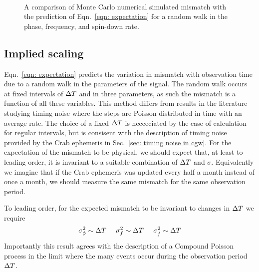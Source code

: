 \begin{figure}[ht]
\centering
{}
\\ 
\caption{A comparison of Monte Carlo numerical simulated mismatch with the prediction
of Eqn.~\eqref{eqn: expectation} for a random walk in the phase, frequency,
and spin-down rate.}
\label{fig: rw I}
\end{figure}

\subsection{Implied scaling}

Eqn.~\eqref{eqn: expectation} predicts the variation in mismatch with
observation time due to a random walk in the parameters of the signal. The
random walk occurs at fixed intervals of $\Delta T$ and in three parameters, as such
the mismatch is a function of all these variables. This method differs from
results in the literature studying timing noise \citep{Cordes1981} where the
steps are Poisson distributed in time with an average rate. The choice of a
fixed $\Delta T$ is necceciated by the ease of calculation for regular intervals,
but is consisent with the description of timing noise provided by the Crab
ephemeris in Sec.~\ref{sec: timing noise in cgw}.  For the expectation of the
mismatch to be physical, we should expect that, at least to leading order, it
is invariant to a suitable combination of $\Delta T$ and $\sigma$. Equivalently we
imagine that if the Crab ephemeris was updated every half a month instead of
once a month, we should measure the same mismatch for the same observation
period.

To leading order, for the expected mismatch to be invariant to changes in $\Delta T$
we require
\begin{equation}
\sigma_{\phi}^{2} \sim \Delta T \;\;\;\;\; \sigma_{f}^{2} \sim \Delta T \;\;\;\;\; \sigma_{\dot{f}}^{2} \sim \Delta T
\end{equation}
Importantly this result agrees with the description of a Compound Poisson
process in the limit where the many events occur during the observation period
$\Delta T$.
